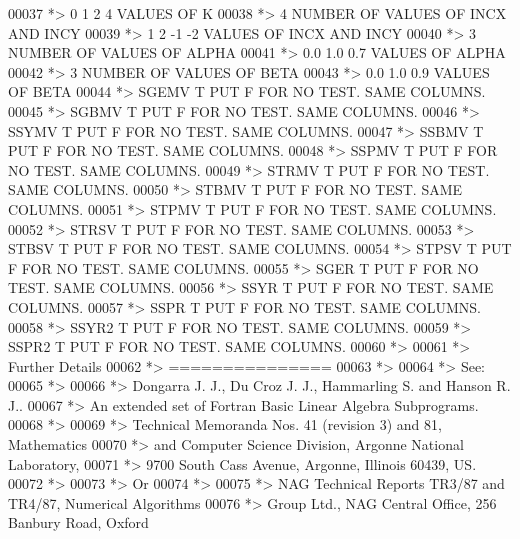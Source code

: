 \begin{DoxyCode}
00037 \textcolor{comment}{*> 0 1 2 4           VALUES OF K}
00038 \textcolor{comment}{*> 4                 NUMBER OF VALUES OF INCX AND INCY}
00039 \textcolor{comment}{*> 1 2 -1 -2         VALUES OF INCX AND INCY}
00040 \textcolor{comment}{*> 3                 NUMBER OF VALUES OF ALPHA}
00041 \textcolor{comment}{*> 0.0 1.0 0.7       VALUES OF ALPHA}
00042 \textcolor{comment}{*> 3                 NUMBER OF VALUES OF BETA}
00043 \textcolor{comment}{*> 0.0 1.0 0.9       VALUES OF BETA}
00044 \textcolor{comment}{*> SGEMV  T PUT F FOR NO TEST. SAME COLUMNS.}
00045 \textcolor{comment}{*> SGBMV  T PUT F FOR NO TEST. SAME COLUMNS.}
00046 \textcolor{comment}{*> SSYMV  T PUT F FOR NO TEST. SAME COLUMNS.}
00047 \textcolor{comment}{*> SSBMV  T PUT F FOR NO TEST. SAME COLUMNS.}
00048 \textcolor{comment}{*> SSPMV  T PUT F FOR NO TEST. SAME COLUMNS.}
00049 \textcolor{comment}{*> STRMV  T PUT F FOR NO TEST. SAME COLUMNS.}
00050 \textcolor{comment}{*> STBMV  T PUT F FOR NO TEST. SAME COLUMNS.}
00051 \textcolor{comment}{*> STPMV  T PUT F FOR NO TEST. SAME COLUMNS.}
00052 \textcolor{comment}{*> STRSV  T PUT F FOR NO TEST. SAME COLUMNS.}
00053 \textcolor{comment}{*> STBSV  T PUT F FOR NO TEST. SAME COLUMNS.}
00054 \textcolor{comment}{*> STPSV  T PUT F FOR NO TEST. SAME COLUMNS.}
00055 \textcolor{comment}{*> SGER   T PUT F FOR NO TEST. SAME COLUMNS.}
00056 \textcolor{comment}{*> SSYR   T PUT F FOR NO TEST. SAME COLUMNS.}
00057 \textcolor{comment}{*> SSPR   T PUT F FOR NO TEST. SAME COLUMNS.}
00058 \textcolor{comment}{*> SSYR2  T PUT F FOR NO TEST. SAME COLUMNS.}
00059 \textcolor{comment}{*> SSPR2  T PUT F FOR NO TEST. SAME COLUMNS.}
00060 \textcolor{comment}{*>}
00061 \textcolor{comment}{*> Further Details}
00062 \textcolor{comment}{*> ===============}
00063 \textcolor{comment}{*>}
00064 \textcolor{comment}{*>    See:}
00065 \textcolor{comment}{*>}
00066 \textcolor{comment}{*>       Dongarra J. J., Du Croz J. J., Hammarling S.  and Hanson R. J..}
00067 \textcolor{comment}{*>       An  extended  set of Fortran  Basic Linear Algebra Subprograms.}
00068 \textcolor{comment}{*>}
00069 \textcolor{comment}{*>       Technical  Memoranda  Nos. 41 (revision 3) and 81,  Mathematics}
00070 \textcolor{comment}{*>       and  Computer Science  Division,  Argonne  National Laboratory,}
00071 \textcolor{comment}{*>       9700 South Cass Avenue, Argonne, Illinois 60439, US.}
00072 \textcolor{comment}{*>}
00073 \textcolor{comment}{*>       Or}
00074 \textcolor{comment}{*>}
00075 \textcolor{comment}{*>       NAG  Technical Reports TR3/87 and TR4/87,  Numerical Algorithms}
00076 \textcolor{comment}{*>       Group  Ltd.,  NAG  Central  Office,  256  Banbury  Road, Oxford}

\end{DoxyCode}
